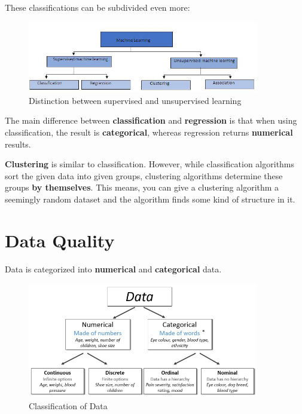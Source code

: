\documentclass[11pt]{article}
\begin{document}
These classifications can be subdivided even more:

\begin{figure}[htb!]
    \centering
    \includegraphics[keepaspectratio=true, width=0.9\textwidth]{disciplines.jpg}
    \caption{Distinction between supervised and unsupervised learning}
    \label{fig:class}
\end{figure}

The main difference between \textbf{classification} and \textbf{regression} is that when using classification, the result is \textbf{categorical}, whereas regression returns \textbf{numerical} results.

\textbf{Clustering} is similar to classification. However, while classification algorithms sort the given data into given groups, clustering algorithms determine these groups \textbf{by themselves}. This means, you can give a clustering algorithm a seemingly random dataset and the algorithm finds some kind of structure in it.

\newpage

\section{Data Quality}

Data is categorized into \textbf{numerical} and \textbf{categorical} data.

\begin{figure}[htb!]
    \centering
    \includegraphics[keepaspectratio=true, width=0.9\textwidth]{data_classification.png}
    \caption{Classification of Data}
    \label{fig:data_classification}
\end{figure}
\end{document}
